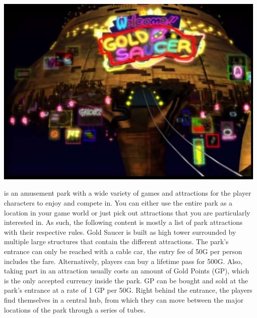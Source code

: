 %
%
\begin{center} \includegraphics[width=\columnwidth]{./art/goldsaucer/goldsaucer.jpg} \end{center}
%
\vfill
%
 is an amusement park with a wide variety of games and attractions for the player characters to enjoy and compete in.
You can either use the entire park as a location in your game world or just pick out attractions that you are particularly interested in.
As such, the following content is mostly a list of park attractions with their respective rules.
Gold Saucer is built as high tower surrounded by multiple large structures that contain the different attractions.
The park's entrance can only be reached with a cable car, the entry fee of 50G per person includes the fare.
Alternatively, players can buy a lifetime pass for 500G.
Also, taking part in an attraction usually costs an amount of Gold Points (GP), which is the only accepted currency inside the park.
GP can be bought and sold at the park's entrance at a rate of 1 GP per 50G.
Right behind the entrance, the players find themselves in a central hub, from which they can move between the major locations of the park through a series of tubes.
%
\vfill
%

